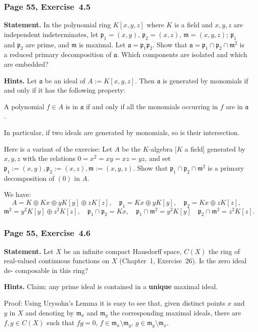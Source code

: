 \documentclass[12pt,letterpaper]{article}%
\newcommand{\mf}{\mathfrak}
\newcommand{\aaa}{\mf a}
\newcommand{\mmm}{\mf m}
\newcommand{\ppp}{\mf p}
\newcommand{\nn}{\noindent}
\begin{document}
\subsubsection{Page 55, Exercise~4.5}%

\textbf{Statement.} In the polynomial ring $K[x,y,z]$ where $K$ is a field and $x,y,z$ are independent indeterminates, let $\ppp_1=(x,y)$, $\ppp_2=(x,z)$, $\mmm=(x,y,z)$; $\ppp_1$ and $\ppp_2$ are prime, and $\mmm$ is maximal. Let $\aaa=\ppp_1\ppp_2$. Show that $\aaa=\ppp_1\cap\ppp_2\cap\mmm^2$ is a reduced primary decomposition of $\aaa$. Which components are isolated and which are embedded?

\nn\textbf{Hints.} Let $\aaa$ be an ideal of $A:=K[x,y,z]$. Then $\aaa$ is generated by monomials if and only if it has the following property:

A polynomial $f\in A$ is in $\aaa$ if and only if all the monomials occurring in $f$ are in $\aaa$.

\nn In particular, if two ideals are generated by monomials, so is their intersection.

Here is a variant of the exercise: Let $A$ be the $K$-algebra [$K$ a field] generated by $x,y,z$ with the relations $0=x^2=xy=xz=yz$, and set $\ppp_1:=(x,y),\ppp_2:=(x,z),\mmm:=(x,y,z)$. Show that $\ppp_1\cap\ppp_2\cap\mmm^2$ is a primary decomposition of $(0)$ in $A$.

We have:
$$
A=K\oplus Kx\oplus yK[y]\oplus zK[z],\quad\ppp_1=Kx\oplus yK[y],\quad\ppp_2=Kx\oplus zK[z],
$$ 
$$
\mmm^2=y^2K[y]\oplus z^2K[z],\quad\ppp_1\cap\ppp_2=Kx,\quad\ppp_1\cap\mmm^2=y^2K[y]\quad\ppp_2\cap\mmm^2=z^2K[z].
$$

\subsubsection{Page 55, Exercise~4.6}%

\textbf{Statement.} Let $X$ be an infinite compact Hausdorff space, $C(X)$ the ring of real-valued continuous functions on $X$ (Chapter~1, Exercise~26). Is the zero ideal de- composable in this ring?

\nn\textbf{Hints.} Claim: any prime ideal is contained in a \textbf{unique} maximal ideal.

\nn Proof: Using Urysohn's Lemma it is easy to see that, given distinct points $x$ and $y$ in $X$ and denoting by $\mmm_x$ and $\mmm_y$ the corresponding maximal ideals, there are $f,g\in C(X)$ such that $fg=0$, $f\in\mmm_x\setminus\mmm_y$, $g\in\mmm_y\setminus\mmm_x$. 
\end{document}
